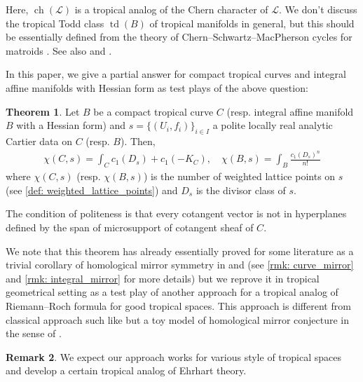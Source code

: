 \documentclass[a4paper,dvipdfmx,reqno,12pt]{amsart}
\theoremstyle{definition}
\newtheorem{Thm}{Theorem}[section]
\newtheorem{Rmk}[Thm]{Remark}
\newcommand{\mcal}[1]{\mathcal{#1}}%
\newcommand{\opn}[1]{\operatorname{#1}}
\numberwithin{equation}{section}
\begin{document}
Here, $\opn{ch}(\mcal{L})$ is a tropical analog of 
the Chern character of $\mcal{L}$.
We don't discuss the tropical Todd class
$\opn{td}(B)$ of tropical manifolds in general, 
but this should be essentially defined from the theory of 
Chern--Schwartz--MacPherson cycles for matroids 
\cite[Previous work]{lopezdemedranoChernSchwartzMacPhersonCyclesMatroids2020}.
See also \cite[5.3]{mikhalkinTropicalGeometryIts2006} and
\cite[Definition 3.20]{shawTropicalSurfaces2015a}.

In this paper, we give a partial answer for compact tropical curves 
and integral affine manifolds with Hessian form
as test plays of the above question:

\begin{Thm} \label{thm: main}
Let $B$ be a compact tropical curve $C$ (resp. integral 
affine manifold $B$
with a Hessian form) and $s=\{(U_i,f_i)\}_{i\in I}$ a polite 
locally real analytic 
Cartier data on $C$ (resp. $B$). Then,
\begin{align}
\chi(C,s)=\int_C c_1(D_s)+c_1(-K_C), \quad \chi(B,s)=\int_B \frac{c_1(D_s)^{n}}{n!}
\end{align}
where $\chi(C,s)$ (resp. $\chi(B,s)$) is the number of weighted lattice
points on $s$ (see \cref{def: weighted_lattice_points}) and $D_s$ is the divisor class of $s$.
\end{Thm}

The condition of politeness is that every cotangent vector 
is not in hyperplanes defined by the span of microsupport of
cotangent sheaf of $C$. 


We note that this theorem has already essentially proved for some
literature as a trivial corollary of homological mirror symmetry 
in \cite{MR4301560} and \cite{auroux2022lagrangian} (see \cref{rmk: curve_mirror} and \cref{rmk: integral_mirror} 
for more details) but we reprove it in tropical  
geometrical setting as a test play of another approach 
for a tropical analog of Riemann--Roch formula for 
good tropical spaces. This approach is different
from classical approach such like 
\cite{MR2355607,gathmannRiemannRochTheoremTropical2008a,mikhalkinTropicalCurvesTheir2008a} but
a toy model of homological mirror conjecture in the sense
of \cite[{}]{auroux2022lagrangian}.

\begin{Rmk}
We expect our approach works for various style 
of tropical spaces and develop a certain tropical 
analog of Ehrhart theory. 
\end{Rmk}
\end{document}
